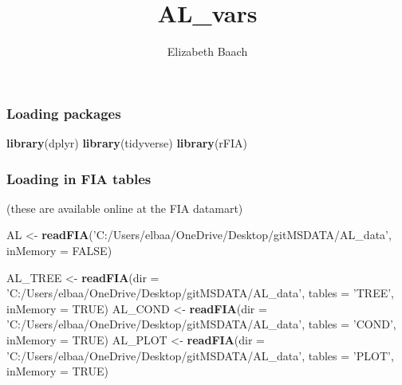 \documentclass[
]{article}
\title{AL\_vars}
\author{Elizabeth Baach}
\date{}
\newenvironment{Shaded}{\begin{snugshade}}{\end{snugshade}}
\newcommand{\DataTypeTok}[1]{\textcolor[rgb]{0.13,0.29,0.53}{#1}}
\newcommand{\KeywordTok}[1]{\textcolor[rgb]{0.13,0.29,0.53}{\textbf{#1}}}
\newcommand{\NormalTok}[1]{#1}
\newcommand{\OtherTok}[1]{\textcolor[rgb]{0.56,0.35,0.01}{#1}}
\newcommand{\StringTok}[1]{\textcolor[rgb]{0.31,0.60,0.02}{#1}}
\begin{document}
\maketitle

\hypertarget{loading-packages}{%
\subsubsection{Loading packages}\label{loading-packages}}

\begin{Shaded}
\begin{Highlighting}[]
\KeywordTok{library}\NormalTok{(dplyr)}
\KeywordTok{library}\NormalTok{(tidyverse)}
\KeywordTok{library}\NormalTok{(rFIA)}
\end{Highlighting}
\end{Shaded}

\hypertarget{loading-in-fia-tables}{%
\subsubsection{Loading in FIA tables}\label{loading-in-fia-tables}}

(these are available online at the FIA datamart)

\begin{Shaded}
\begin{Highlighting}[]
\NormalTok{AL <-}\StringTok{ }\KeywordTok{readFIA}\NormalTok{(}\StringTok{'C:/Users/elbaa/OneDrive/Desktop/gitMSDATA/AL_data'}\NormalTok{, }\DataTypeTok{inMemory =} \OtherTok{FALSE}\NormalTok{)}

\NormalTok{AL_TREE <-}\StringTok{ }\KeywordTok{readFIA}\NormalTok{(}\DataTypeTok{dir =} \StringTok{'C:/Users/elbaa/OneDrive/Desktop/gitMSDATA/AL_data'}\NormalTok{, }\DataTypeTok{tables =} \StringTok{'TREE'}\NormalTok{, }\DataTypeTok{inMemory =} \OtherTok{TRUE}\NormalTok{)}
\NormalTok{AL_COND <-}\StringTok{ }\KeywordTok{readFIA}\NormalTok{(}\DataTypeTok{dir =} \StringTok{'C:/Users/elbaa/OneDrive/Desktop/gitMSDATA/AL_data'}\NormalTok{, }\DataTypeTok{tables =} \StringTok{'COND'}\NormalTok{, }\DataTypeTok{inMemory =} \OtherTok{TRUE}\NormalTok{)}
\NormalTok{AL_PLOT <-}\StringTok{ }\KeywordTok{readFIA}\NormalTok{(}\DataTypeTok{dir =} \StringTok{'C:/Users/elbaa/OneDrive/Desktop/gitMSDATA/AL_data'}\NormalTok{, }\DataTypeTok{tables =} \StringTok{'PLOT'}\NormalTok{, }\DataTypeTok{inMemory =} \OtherTok{TRUE}\NormalTok{)}
\end{Highlighting}
\end{Shaded}
\end{document}
